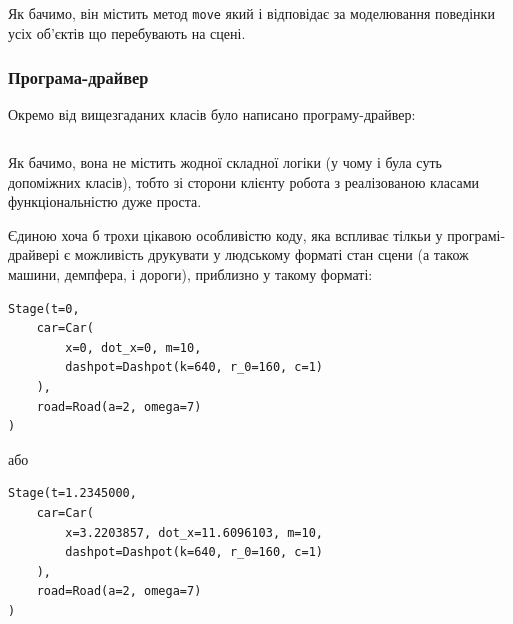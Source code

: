 Як бачимо, він містить метод \verb|move| який і відповідає за моделювання поведінки усіх об'єктів що перебувають на сцені.

\subsubsection{Програма-драйвер}

Окремо від вищезгаданих класів було написано програму-драйвер:
\inputminted[firstline=9, lastline=85]{python}{../py/main.py}

Як бачимо, вона не містить жодної складної логіки (у чому і була суть допоміжних класів), тобто зі сторони клієнту робота з реалізованою класами функціональністю дуже проста. \medskip

Єдиною хоча б трохи цікавою особливістю коду, яка вспливає тілкьи у програмі-драйвері є можливість друкувати у людському форматі стан сцени (а також машини, демпфера, і дороги), приблизно у такому форматі:
\begin{verbatim}
Stage(t=0, 
	car=Car(
		x=0, dot_x=0, m=10, 
		dashpot=Dashpot(k=640, r_0=160, c=1)
	), 
	road=Road(a=2, omega=7)
)
\end{verbatim}

або
\begin{verbatim}
Stage(t=1.2345000, 
	car=Car(
		x=3.2203857, dot_x=11.6096103, m=10, 
		dashpot=Dashpot(k=640, r_0=160, c=1)
	), 
	road=Road(a=2, omega=7)
)
\end{verbatim}



